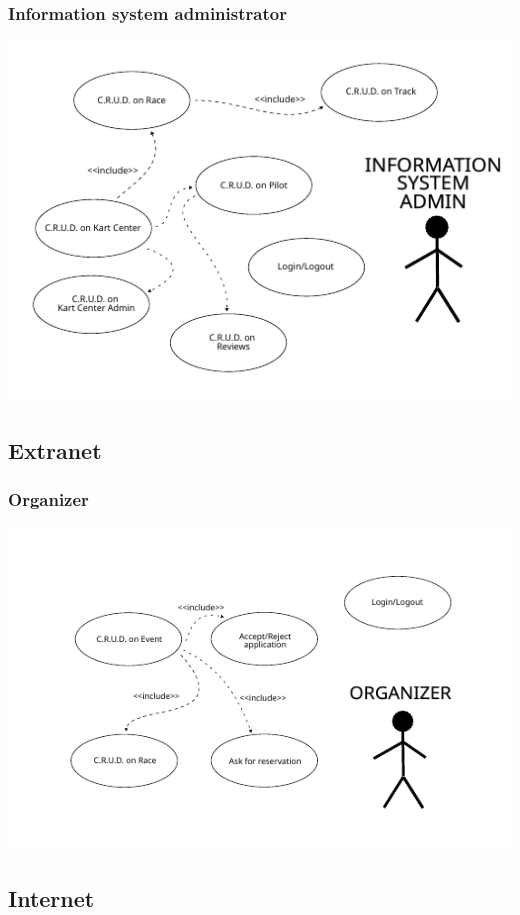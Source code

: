 \documentclass{beamer}
\begin{document}
\begin{frame}
    \frametitle{Information system administrator}
    \centering
    \includegraphics[width=0.9\linewidth]{drawings/uc-isadmin.pdf}
\end{frame}

\subsection*{Extranet}

\begin{frame}
    \frametitle{Organizer}
    \centering
    \includegraphics[width=0.9\linewidth]{drawings/uc-organizer.pdf}
\end{frame}

\subsection*{Internet}
\end{document}
